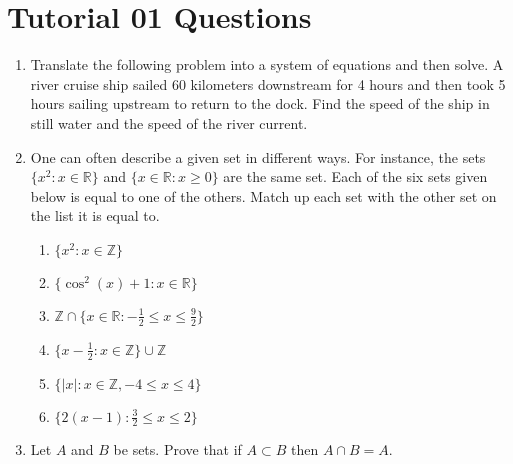 \documentclass[12pt]{article}
\begin{document}
\section*{Tutorial 01 Questions}

\begin{enumerate}
    \item Translate the following problem into a system of equations and then solve. 
    A river cruise ship sailed 60 kilometers downstream for 4 hours and then took 5 hours sailing upstream to return to the dock. 
    Find the speed of the ship in still water and the speed of the river current.

    \item One can often describe a given set in different ways. 
    For instance, the sets $\{x^2 : x \in \mathbb{R}\}$ and $\{x \in \mathbb{R} : x \geq 0\}$ are the same set. 
    Each of the six sets given below is equal to one of the others. Match up each set with the other set on the list it is equal to.
    \begin{enumerate}
        \item $\{x^2 : x \in \mathbb{Z}\}$
        \item $\{\cos^2(x) + 1 : x \in \mathbb{R}\}$
        \item $\mathbb{Z} \cap \{x \in \mathbb{R} : -\frac{1}{2} \leq x \leq \frac{9}{2}\}$
        \item $\{x - \frac{1}{2} : x \in \mathbb{Z}\} \cup \mathbb{Z}$
        \item $\{|x| : x \in \mathbb{Z}, -4 \leq x \leq 4\}$
        \item $\{2(x - 1) : \frac{3}{2} \leq x \leq 2\}$
    \end{enumerate}

    \item Let $A$ and $B$ be sets. Prove that if $A \subset B$ then $A \cap B = A$.


\end{enumerate}
\end{document}
